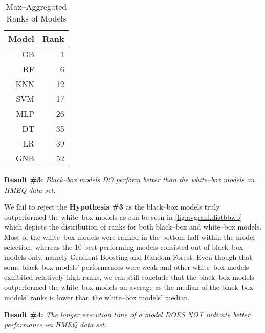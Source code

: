 \begin{table}[H]
    \small
    \setlength{\tabcolsep}{8pt}
    \renewcommand{\arraystretch}{1.3}
    \centering
        \caption[Max--Aggregated Ranks of Models]{Max--Aggregated Ranks of Models}\label{tab:maxranks}
        \begin{tabular}{r r}
    \toprule
    \textbf{Model} & \textbf{Rank}\\
    \midrule
    \hline
    GB & 1 \\ 
    RF & 6 \\ 
    KNN & 12 \\ 
    SVM & 17 \\ 
    MLP & 26 \\ 
    DT & 35 \\ 
    LR & 39 \\
    GNB & 52 \\
    \hline
    \bottomrule
    \end{tabular}
    \vspace{0.35em}

        \vspace{-1em}
\end{table}

\vspace{0.3cm}

\noindent \textbf{Result \#3:} \textit{Black--box models \underline{DO} perform better than the white--box models on HMEQ data set.}

We fail to reject the \textbf{Hypothesis \#3} as the black--box models truly outperformed the white--box models as can be seen in \autoref{fig:avgrankdistbbwb} which depicts the distribution of ranks for both black--box and white--box models.
Most of the white--box models were ranked in the bottom half within the model selection, whereas the 10 best performing models consisted out of black--box models only, namely Gradient Boosting and Random Forest.
Even though that some black--box models' performances were weak and other white--box models exhibited relatively high ranks, we can still conclude that the black--box models outperformed the white--box models on average as the median of the black--box models' ranks is lower than the white--box models' median.
\vspace{0.3cm}

\noindent \textbf{Result \#4:} \textit{The longer execution time of a model \underline{DOES NOT} indicate better performance on HMEQ data set.}

